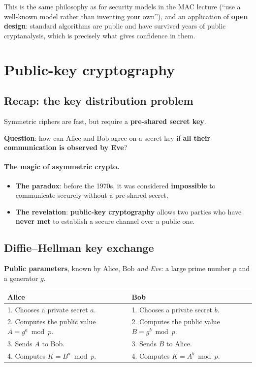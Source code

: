 \begin{remark}
This is the same philosophy as for security models in the MAC lecture (``use a well-known model rather than inventing your own''), and an application of \textbf{open design}: standard algorithms are public and have survived years of public cryptanalysis, which is precisely what gives confidence in them.
\end{remark}

\section{Public-key cryptography}
\label{sec:public-key}

\subsection{Recap: the key distribution problem}

Symmetric ciphers are fast, but require a \textbf{pre-shared secret key}.

\textbf{Question}: how can Alice and Bob agree on a secret key if \textbf{all their communication is observed by Eve}?

\paragraph{The magic of asymmetric crypto.}
\begin{itemize}
    \item \textbf{The paradox}: before the 1970s, it was considered \textbf{impossible} to communicate securely without a pre-shared secret.
    \item \textbf{The revelation}: \textbf{public-key cryptography} allows two parties who have \textbf{never met} to establish a secure channel over a public one.
\end{itemize}

\subsection{Diffie--Hellman key exchange}

\begin{definition}
\textbf{Public parameters}, known by Alice, Bob \emph{and Eve}: a large prime number $p$ and a generator $g$.

\begin{center}
\begin{tabular}{@{}p{6.5cm}p{6.5cm}@{}}
\toprule
\textbf{Alice} & \textbf{Bob} \\
\midrule
1. Chooses a private secret $a$. & 1. Chooses a private secret $b$. \\
2. Computes the public value $A = g^a \bmod p$. & 2. Computes the public value $B = g^b \bmod p$. \\
3. Sends $A$ to Bob. & 3. Sends $B$ to Alice. \\
4. Computes $K = B^a \bmod p$. & 4. Computes $K = A^b \bmod p$. \\
\bottomrule
\end{tabular}
\end{center}
\end{definition}

